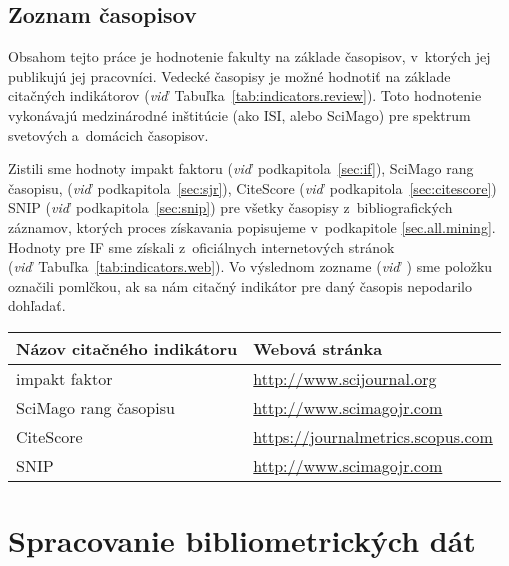 \subsection{Zoznam časopisov}
\label{sec:journal.mining}

Obsahom tejto práce je hodnotenie fakulty na základe časopisov, v~ktorých jej
publikujú jej pracovníci.  Vedecké časopisy je možné hodnotiť na základe
citačných indikátorov (\emph{viď}~Tabuľka~\ref{tab:indicators.review}).  Toto
hodnotenie vykonávajú medzinárodné inštitúcie (ako ISI, alebo SciMago) pre
spektrum svetových a~domácich časopisov.

Zistili sme hodnoty impakt faktoru (\emph{viď}~podkapitola~\ref{sec:if}),
SciMago rang časopisu, (\emph{viď}~podkapitola~\ref{sec:sjr}), CiteScore
(\emph{viď}~podkapitola~\ref{sec:citescore}) SNIP
(\emph{viď}~podkapitola~\ref{sec:snip}) pre všetky časopisy z~bibliografických
záznamov, ktorých proces získavania popisujeme v~podkapitole
\ref{sec.all.mining}.  Hodnoty pre IF sme získali z~oficiálnych internetových
stránok (\emph{viď}~Tabuľka~\ref{tab:indicators.web}).  Vo výslednom zozname
(\emph{viď}~) sme položku označili pomlčkou, ak sa nám citačný
indikátor pre daný časopis nepodarilo dohľadať.

\begin{SCtable}
  \centering\small
  \caption[Webové stránky citačných indikátorov na hodnotenie časopisov]%
  {Zoznam citačných indikátorov na hodnotenie časopisov, s~odkazmi na oficiálne
    webové stránky.}
  \label{tab:indicators.web}
  \begin{tabular}{ll}
    \toprule
    Názov citačného indikátoru      & Webová stránka\\
    \midrule
    impakt faktor         & {\footnotesize \url{http://www.scijournal.org}}         \\
    SciMago rang časopisu & {\footnotesize \url{http://www.scimagojr.com}}          \\
    CiteScore             & {\footnotesize \url{https://journalmetrics.scopus.com}} \\
    SNIP                  & {\footnotesize \url{http://www.scimagojr.com}}          \\
    \bottomrule
  \end{tabular}
\end{SCtable}

\section{Spracovanie bibliometrických dát}


